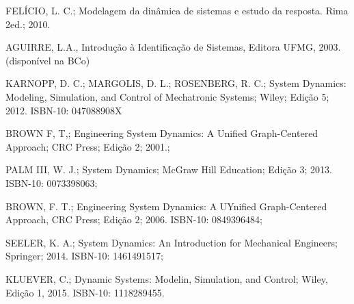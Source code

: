 {{    FELÍCIO, L. C.; Modelagem da dinâmica de sistemas e estudo da resposta. Rima 2ed.; 2010.

    AGUIRRE, L.A., Introdução à Identificação de Sistemas, Editora UFMG, 2003. (disponível na BCo)

        KARNOPP, D. C.; MARGOLIS, D. L.; ROSENBERG, R. C.; System Dynamics: Modeling, Simulation, and Control of Mechatronic Systems; Wiley; Edição 5; 2012. ISBN-10: 047088908X

    BROWN F, T,; Engineering System Dynamics: A Unified Graph-Centered Approach; CRC Press; Edição 2; 2001.;

    PALM III, W. J.; System Dynamics; McGraw Hill Education; Edição 3; 2013. ISBN-10: 0073398063;

    BROWN, F. T.; Engineering System Dynamics: A UYnified Graph-Centered Approach, CRC Press; Edição 2;
    2006. ISBN-10: 0849396484;

    SEELER, K. A.; System Dynamics: An Introduction for Mechanical Engineers; Springer; 2014. ISBN-10: 1461491517;

    KLUEVER, C.; Dynamic Systems: Modelin, Simulation, and Control; Wiley, Edição 1, 2015. ISBN-10: 1118289455.
    }
    
}